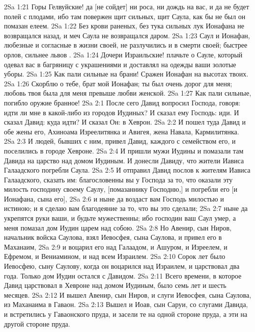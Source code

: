 \vs 2Sa 1:21 Горы Гелвуйские! да [не сойдет] ни роса, ни дождь на вас, и да не будет  полей с плодами, ибо там повержен щит сильных, щит Саула, как бы не был он помазан елеем.
\vs 2Sa 1:22 Без крови раненых, без тука сильных лук Ионафана не возвращался назад, и меч Саула не возвращался даром.
\vs 2Sa 1:23 Саул и Ионафан, любезные и согласные в жизни своей, не разлучились и в смерти своей; быстрее орлов, сильнее львов .
\vs 2Sa 1:24 Дочери Израильские! плачьте о Сауле, который одевал вас в багряницу с украшениями и доставлял на одежды ваши золотые уборы.
\vs 2Sa 1:25 Как пали сильные на брани! Сражен Ионафан на высотах твоих.
\vs 2Sa 1:26 Скорблю о тебе, брат мой Ионафан; ты был очень дорог для меня; любовь твоя была для меня превыше любви женской.
\vs 2Sa 1:27 Как пали сильные, погибло оружие бранное!
\vs 2Sa 2:1 После сего Давид вопросил Господа, говоря: идти ли мне в какой-либо из городов Иудиных? И сказал ему Господь: иди. И сказал Давид: куда идти? И сказал Он: в Хеврон.
\vs 2Sa 2:2 И пошел туда Давид и обе жены его, Ахиноама Изреелитянка и Авигея,  жена Навала, Кармилитянка.
\vs 2Sa 2:3 И людей, бывших с ним, привел Давид, каждого с семейством его, и поселились в городе Хевроне.
\vs 2Sa 2:4 И пришли мужи Иудины и помазали там Давида на царство над домом Иудиным. И донесли Давиду, что жители Иависа Галаадского погребли Саула.
\rsbpar\vs 2Sa 2:5 И отправил Давид послов к жителям Иависа Галаадского, сказать им: благословенны вы у Господа за то, что оказали эту милость господину своему Саулу, [помазаннику Господню,] и погребли его [и Ионафана, сына его],
\vs 2Sa 2:6 и ныне да воздаст вам Господь милостью и истиною; и я сделаю вам благодеяние за то, что вы это сделали;
\vs 2Sa 2:7 ныне да укрепятся руки ваши, и будьте мужественны; ибо господин ваш Саул умер, а меня помазал дом Иудин царем над собою.
\vs 2Sa 2:8 Но Авенир, сын Ниров, начальник войска Саулова, взял Иевосфея, сына Саулова, и привел его в Маханаим,
\vs 2Sa 2:9 и воцарил его над Галаадом, и Ашуром, и Изреелем, и Ефремом, и Вениамином, и над всем Израилем.
\vs 2Sa 2:10 Сорок лет было Иевосфею, сыну Саулову, когда он воцарился над Израилем, и царствовал два года. Только дом Иудин остался с Давидом.
\vs 2Sa 2:11 Всего времени, в которое Давид царствовал в Хевроне над домом Иудиным, было семь лет и шесть месяцев.
\vs 2Sa 2:12 И вышел Авенир, сын Ниров, и слуги Иевосфея, сына Саулова, из Маханаима в Гаваон.
\vs 2Sa 2:13 Вышел и Иоав, сын Саруи, со слугами Давида, и встретились у Гаваонского пруда, и засели те на одной стороне пруда, а эти на другой стороне пруда.
